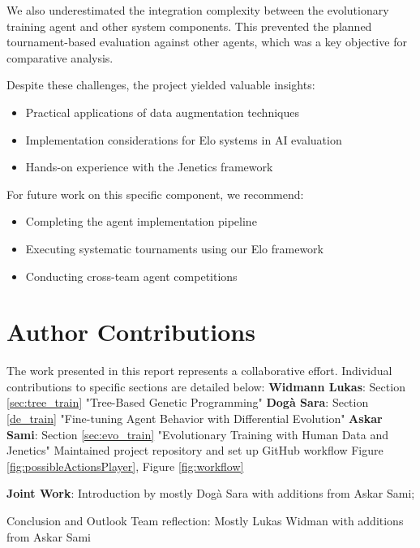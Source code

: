 \documentclass[sigconf]{acmart} %
\begin{document}
We also underestimated the integration complexity between the evolutionary training agent and other system components. This prevented the planned tournament-based evaluation against other agents, which was a key objective for comparative analysis.

Despite these challenges, the project yielded valuable insights:
\begin{itemize}
	\item Practical applications of data augmentation techniques
	\item Implementation considerations for Elo systems in AI evaluation
	\item Hands-on experience with the Jenetics framework
\end{itemize}

For future work on this specific component, we recommend:
\begin{itemize}
	\item Completing the agent implementation pipeline
	\item Executing systematic tournaments using our Elo framework
	\item Conducting cross-team agent competitions
\end{itemize}

\section{Author Contributions}
The work presented in this report represents a collaborative effort. Individual contributions to specific sections are detailed below:
\textbf{Widmann Lukas}: Section \ref{sec:tree_train} "Tree-Based Genetic Programming"
\newline \textbf{Dogà Sara}: Section \ref{de_train} "Fine-tuning Agent Behavior with Differential Evolution"
\newline \textbf{Askar Sami}: \newline
Section \ref{sec:evo_train} "Evolutionary Training with Human Data and Jenetics" 
\newline Maintained project repository and set up GitHub workflow \cite{rmb_github}
\newline Figure \ref{fig:possibleActionsPlayer}, Figure \ref{fig:workflow}

	 \textbf{Joint Work}: Introduction by mostly Dogà Sara with additions from Askar Sami;
	 
	  Conclusion and Outlook Team reflection: Mostly Lukas Widman with additions from Askar Sami




\end{document}
